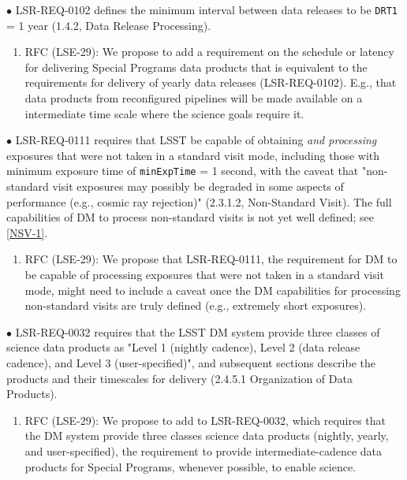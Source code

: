 $\bullet$ LSR-REQ-0102 defines the minimum interval between data releases to be \texttt{DRT1} = 1 year (1.4.2, Data Release Processing).
\begin{enumerate}[resume,topsep=-10pt,after=\vspace{10pt},label= \textbf{Action \Roman*}] \item \label{LSR-1} RFC (LSE-29): We propose to add a requirement on the schedule or latency for delivering Special Programs data products that is equivalent to the requirements for delivery of yearly data releases (LSR-REQ-0102). E.g., that data products from reconfigured pipelines will be made available on a intermediate time scale where the science goals require it. \end{enumerate}

$\bullet$ LSR-REQ-0111 requires that LSST be capable of obtaining \textit{and processing} exposures that were not taken in a standard visit mode, including those with minimum exposure time of \texttt{minExpTime} = 1 second, with the caveat that "non-standard visit exposures may possibly be degraded in some aspects of performance (e.g., cosmic ray rejection)" (2.3.1.2, Non-Standard Visit). The full capabilities of DM to process non-standard visits is not yet well defined; see \ref{NSV-1}.
\begin{enumerate}[resume,topsep=-10pt,after=\vspace{10pt},label= \textbf{Action \Roman*}] \item \label{LSR-2} RFC (LSE-29): We propose that LSR-REQ-0111, the requirement for DM to be capable of processing exposures that were not taken in a standard visit mode, might need to include a caveat once the DM capabilities for processing non-standard visits are truly defined (e.g., extremely short exposures). \end{enumerate}

$\bullet$ LSR-REQ-0032 requires that the LSST DM system provide three classes of science data products as "Level 1 (nightly cadence), Level 2 (data release cadence), and Level 3 (user-specified)", and subsequent sections describe the products and their timescales for delivery (2.4.5.1 Organization of Data Products).
\begin{enumerate}[resume,topsep=-10pt,after=\vspace{10pt},label= \textbf{Action \Roman*}] \item \label{LSR-3} RFC (LSE-29): We propose to add to LSR-REQ-0032, which requires that the DM system provide three classes science data products (nightly, yearly, and user-specified), the requirement to provide intermediate-cadence data products for Special Programs, whenever possible, to enable science. \end{enumerate}


